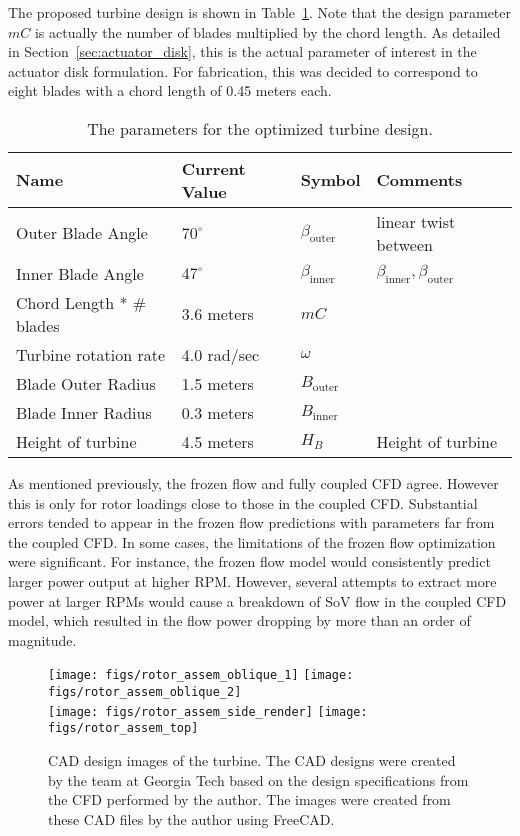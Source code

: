 The proposed turbine design is shown in Table~\ref{tab:turbine}. Note
that the design parameter $mC $ is actually the number of blades
multiplied by the chord length. As detailed in
Section~\ref{sec:actuator_disk}, this is the actual parameter of
interest in the actuator disk formulation. For fabrication, this was 
decided to correspond to eight blades with a chord length of 0.45 meters
each. %

\begin{table}[]
\centering
 \caption{The parameters for the optimized turbine design.}
\begin{tabular}{l|l|l|l}
Name                & Current Value    & Symbol           & Comments \\
 \hline
Outer Blade Angle & $70^{\circ}$ & $\beta_{\text{outer}}$  & linear twist between \\
Inner Blade Angle & $47^{\circ}$ & $\beta_\text{inner}$    & 
	     $\beta_\text{inner},\beta_\text{outer}$ \\ 
Chord Length * \# blades   & 3.6 meters  & $mC $ &  \\
Turbine rotation rate & 4.0 rad/sec  & $\omega$         &  \\
Blade Outer Radius  & 1.5 meters   & $B_\text{outer}$ &  \\
Blade Inner Radius  & 0.3 meters   & $B_\text{inner}$ &  \\
Height of turbine   & 4.5 meters   & $H_B$            & Height of turbine \\
\hline
\end{tabular}
 \label{tab:turbine}
\end{table}

As mentioned previously, the frozen flow and fully coupled CFD
agree. However this is only for rotor loadings close to those in the
coupled CFD. Substantial errors tended to appear in the frozen flow
predictions with parameters far from the coupled CFD. In some cases, the
limitations of the frozen flow optimization were significant. For
instance, the frozen flow model would consistently predict larger power
output at higher RPM. However, several attempts to extract more power at
larger RPMs would cause a breakdown of SoV flow in the coupled CFD
model, which resulted in the flow power dropping by more than an order
of magnitude.%

  \begin{figure}
   \centering
   \texttt{[image: figs/rotor\_assem\_oblique\_1]}
   \hfill
   \texttt{[image: figs/rotor\_assem\_oblique\_2]}
   \\
   \vspace{1em}
   \texttt{[image: figs/rotor\_assem\_side\_render]}
   \hfill
   \texttt{[image: figs/rotor\_assem\_top]}
   \\   
   \caption{CAD design images of the turbine. The CAD designs were
   created by the team at Georgia Tech based on the design
   specifications from the CFD performed by the author. The images were
   created from these CAD files by the author using
   FreeCAD\cite{Falck}.}  
   \label{fig:cad_turbine}
  \end{figure}


